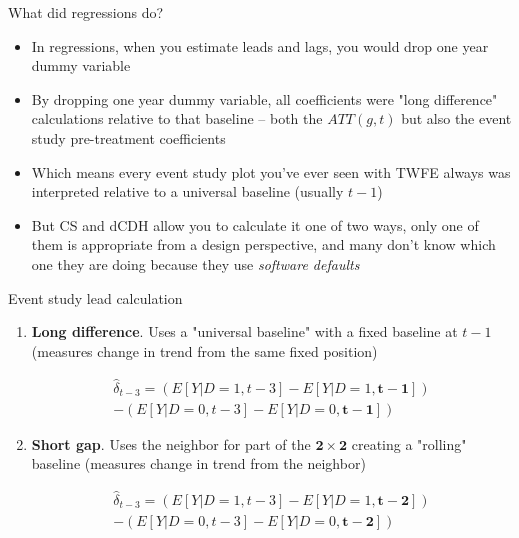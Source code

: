 \documentclass{beamer}
\begin{document}
\begin{frame}{What did regressions do?}

\begin{itemize}

\item In regressions, when you estimate leads and lags, you would drop one year dummy variable
\item By dropping one year dummy variable, all coefficients were "long difference" calculations relative to that baseline -- both the $ATT(g,t)$ but also the event study pre-treatment coefficients
\item Which means every event study plot you've ever seen with TWFE always was interpreted relative to a universal baseline (usually $t-1$)
\item But CS and dCDH allow you to calculate it one of two ways, only one of them is appropriate from a design perspective, and many don't know which one they are doing because they use \emph{software defaults}

\end{itemize}

\end{frame}




\begin{frame}{Event study lead calculation}

	\begin{enumerate}
	\item \textbf{Long difference}. Uses a "universal baseline" with a fixed baseline at \( t-1 \) (measures change in trend from the same fixed position)
	
	\begin{eqnarray*}
	 \widehat{\delta}_{t-3} = \left( E[Y|D=1, t-3] - E[Y|D=1,\mathbf{ t-1}] \right) \\
	 - \left( E[Y|D=0, t-3] - E[Y|D=0, \mathbf{t-1}] \right)
	 \end{eqnarray*}


	\item \textbf{Short gap}. Uses the neighbor for part of the $\mathbf{2 \times 2}$ creating a "rolling" baseline (measures change in trend from the neighbor)
	
	\begin{eqnarray*}
	 \widehat{\delta}_{t-3} = \left( E[Y|D=1, t-3] - E[Y|D=1,\mathbf{ t-2}] \right) \\
	 - \left( E[Y|D=0, t-3] - E[Y|D=0, \mathbf{t-2}] \right)
	 \end{eqnarray*}
	 
	 \end{enumerate}


\end{frame}
\end{document}
